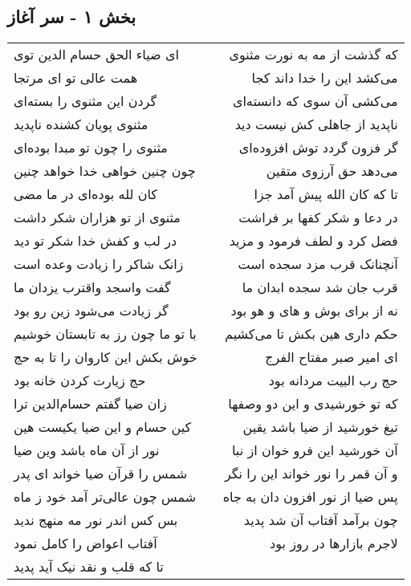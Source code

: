 \begin{center}
\section*{بخش ۱ - سر آغاز}
\label{sec:sh001}
\begin{longtable}{l p{0.5cm} r}
ای ضیاء الحق حسام الدین توی
&&
که گذشت از مه به نورت مثنوی
\\
همت عالی تو ای مرتجا
&&
می‌کشد این را خدا داند کجا
\\
گردن این مثنوی را بسته‌ای
&&
می‌کشی آن سوی که دانسته‌ای
\\
مثنوی پویان کشنده ناپدید
&&
ناپدید از جاهلی کش نیست دید
\\
مثنوی را چون تو مبدا بوده‌ای
&&
گر فزون گردد توش افزوده‌ای
\\
چون چنین خواهی خدا خواهد چنین
&&
می‌دهد حق آرزوی متقین
\\
کان لله بوده‌ای در ما مضی
&&
تا که کان الله پیش آمد جزا
\\
مثنوی از تو هزاران شکر داشت
&&
در دعا و شکر کفها بر فراشت
\\
در لب و کفش خدا شکر تو دید
&&
فضل کرد و لطف فرمود و مزید
\\
زانک شاکر را زیادت وعده است
&&
آنچنانک قرب مزد سجده است
\\
گفت واسجد واقترب یزدان ما
&&
قرب جان شد سجده ابدان ما
\\
گر زیادت می‌شود زین رو بود
&&
نه از برای بوش و های و هو بود
\\
با تو ما چون رز به تابستان خوشیم
&&
حکم داری هین بکش تا می‌کشیم
\\
خوش بکش این کاروان را تا به حج
&&
ای امیر صبر مفتاح الفرج
\\
حج زیارت کردن خانه بود
&&
حج رب البیت مردانه بود
\\
زان ضیا گفتم حسام‌الدین ترا
&&
که تو خورشیدی و این دو وصفها
\\
کین حسام و این ضیا یکیست هین
&&
تیغ خورشید از ضیا باشد یقین
\\
نور از آن ماه باشد وین ضیا
&&
آن خورشید این فرو خوان از نبا
\\
شمس را قرآن ضیا خواند ای پدر
&&
و آن قمر را نور خواند این را نگر
\\
شمس چون عالی‌تر آمد خود ز ماه
&&
پس ضیا از نور افزون دان به جاه
\\
بس کس اندر نور مه منهج ندید
&&
چون برآمد آفتاب آن شد پدید
\\
آفتاب اعواض را کامل نمود
&&
لاجرم بازارها در روز بود
\\
تا که قلب و نقد نیک آید پدید

\end{longtable}
\end{center}
